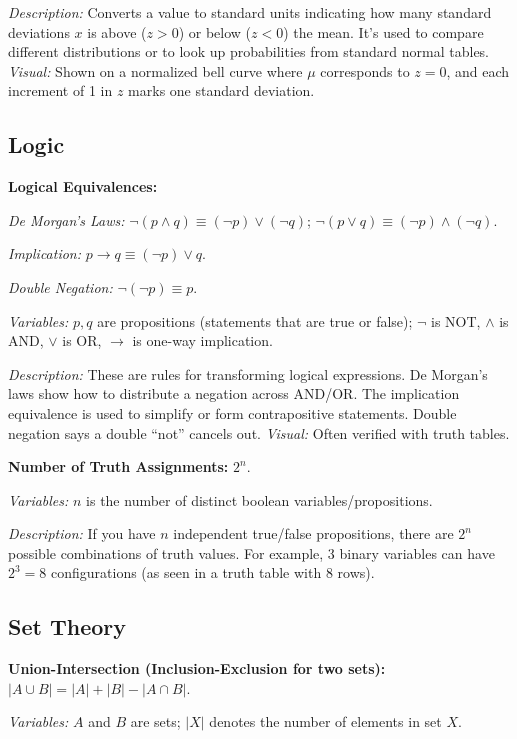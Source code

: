 \documentclass{article}
\begin{document}
\textit{Description:} Converts a value to standard units indicating how many standard deviations $x$ is above ($z>0$) or below ($z<0$) the mean. It’s used to compare different distributions or to look up probabilities from standard normal tables. \textit{Visual:} Shown on a normalized bell curve where $\mu$ corresponds to $z=0$, and each increment of 1 in $z$ marks one standard deviation.

\subsection*{Logic}

\textbf{Logical Equivalences:}

\textit{De Morgan’s Laws:} $\neg(p \wedge q) \equiv (\neg p) \vee (\neg q)$;  $\neg(p \vee q) \equiv (\neg p) \wedge (\neg q)$.

\textit{Implication:} $p \to q \equiv (\neg p) \vee q$.

\textit{Double Negation:} $\neg(\neg p) \equiv p$.

\textit{Variables:} $p, q$ are propositions (statements that are true or false); $\neg$ is NOT, $\wedge$ is AND, $\vee$ is OR, $\to$ is one-way implication.

\textit{Description:} These are rules for transforming logical expressions. De Morgan’s laws show how to distribute a negation across AND/OR. The implication equivalence is used to simplify or form contrapositive statements. Double negation says a double “not” cancels out. \textit{Visual:} Often verified with truth tables.

\textbf{Number of Truth Assignments:} $2^n$.

\textit{Variables:} $n$ is the number of distinct boolean variables/propositions.

\textit{Description:} If you have $n$ independent true/false propositions, there are $2^n$ possible combinations of truth values. For example, 3 binary variables can have $2^3 = 8$ configurations (as seen in a truth table with 8 rows).

\subsection*{Set Theory}

\textbf{Union-Intersection (Inclusion-Exclusion for two sets):} $|A \cup B| = |A| + |B| - |A \cap B|$.

\textit{Variables:} $A$ and $B$ are sets; $|X|$ denotes the number of elements in set $X$.
\end{document}
